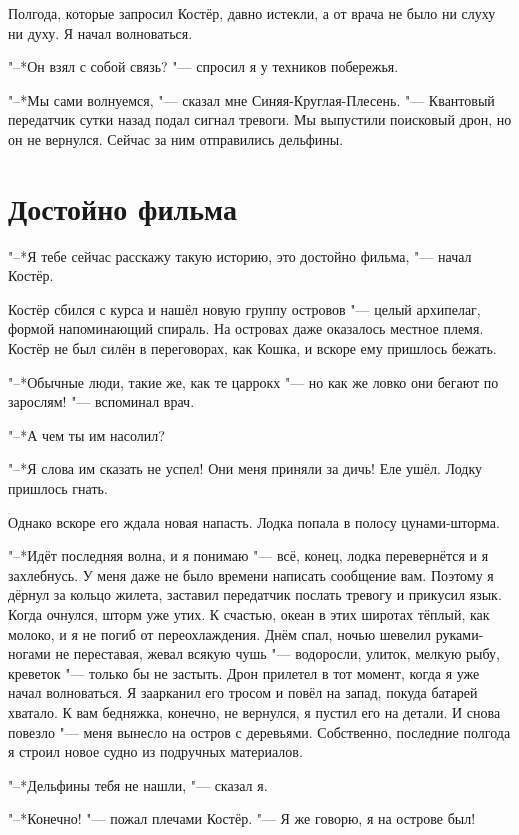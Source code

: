 \documentclass[a4paper,10pt,fleqn]{book}
\begin{document}
Полгода, которые запросил Костёр, давно истекли, а от врача не было ни слуху ни духу.
Я начал волноваться.

"--*Он взял с собой связь? "--- спросил я у техников побережья.

"--*Мы сами волнуемся, "--- сказал мне Синяя-Круглая-Плесень.
"--- Квантовый передатчик сутки назад подал сигнал тревоги.
Мы выпустили поисковый дрон, но он не вернулся.
Сейчас за ним отправились дельфины.

\section{Достойно фильма}

"--*Я тебе сейчас расскажу такую историю, это достойно фильма, "--- начал Костёр.

Костёр сбился с курса и нашёл новую группу островов "--- целый архипелаг, формой напоминающий спираль.
На островах даже оказалось местное племя.
Костёр не был силён в переговорах, как Кошка, и вскоре ему пришлось бежать.

"--*Обычные люди, такие же, как те царрокх "--- но как же ловко они бегают по зарослям! "--- вспоминал врач.

"--*А чем ты им насолил?

"--*Я слова им сказать не успел!
Они меня приняли за дичь!
Еле ушёл.
Лодку пришлось гнать.

Однако вскоре его ждала новая напасть.
Лодка попала в полосу цунами-шторма.

"--*Идёт последняя волна, и я понимаю "--- всё, конец, лодка перевернётся и я захлебнусь.
У меня даже не было времени написать сообщение вам.
Поэтому я дёрнул за кольцо жилета, заставил передатчик послать тревогу и прикусил язык.
Когда очнулся, шторм уже утих.
К счастью, океан в этих широтах тёплый, как молоко, и я не погиб от переохлаждения.
Днём спал, ночью шевелил руками-ногами не переставая, жевал всякую чушь "--- водоросли, улиток, мелкую рыбу, креветок "--- только бы не застыть.
Дрон прилетел в тот момент, когда я уже начал волноваться.
Я заарканил его тросом и повёл на запад, покуда батарей хватало.
К вам бедняжка, конечно, не вернулся, я пустил его на детали.
И снова повезло "--- меня вынесло на остров с деревьями.
Собственно, последние полгода я строил новое судно из подручных материалов.

"--*Дельфины тебя не нашли, "--- сказал я.

"--*Конечно! "--- пожал плечами Костёр.
"--- Я же говорю, я на острове был!
\end{document}

